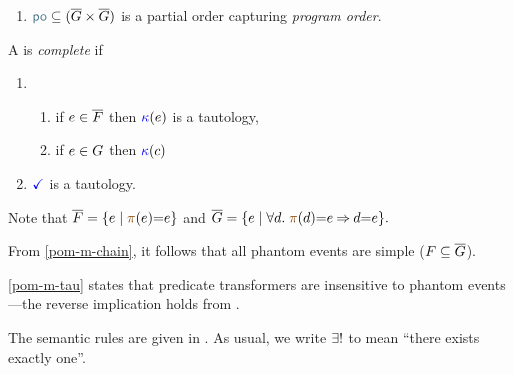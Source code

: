 \begin{definition}
\begin{enumerate}[,label=(\textsc{m}\arabic*),ref=\textsc{m}\arabic*]
  \item \label{pom-po} 
    ${\rpox} \subseteq (\umEvs\times\umEvs)$ is a partial order capturing
    \emph{program order}.
  \end{enumerate}


  A \PwTc{} is \emph{complete} if 
    \begin{enumerate}[,label=(\textsc{c}\arabic*),ref=\textsc{c}\arabic*]

      \setcounter{enumi}{\value{kappa}}
    \item[]
      \begin{enumerate}[leftmargin=0pt]
      \item \label{top-kappa-real}
        if $e\in\overline{F}$ then ${\color{blue}\kappa}(e)$ is a tautology,
      \item \label{top-kappa-phantom}
        if $e\in G$ %
        then
        ${\color{blue}\kappa}(c)$
      \end{enumerate}

      \setcounter{enumi}{\value{Bterm}}
    \item \label{top-term-c11}
      $\aTerm$ is a tautology.
    \end{enumerate}
\end{definition}
Note that
\begin{math}
  \reEvs=\{\aEv\mid\fmrg{\aEv}{=}\aEv\}
\end{math}
and
\begin{math}
  \umEvs=\{\aEv\mid\forall\bEv.\;\fmrg{\bEv}{=}\aEv \limplies \bEv{=}\aEv\}.
\end{math}

From \ref{pom-m-chain}, it follows that all phantom events are simple
($F\subseteq\overline{G}$).

\ref{pom-m-tau} states that predicate transformers are insensitive to phantom
events---the reverse implication holds from .



The semantic rules are given in .  As usual, we write
$\exists!$ to mean ``there exists exactly one''.

